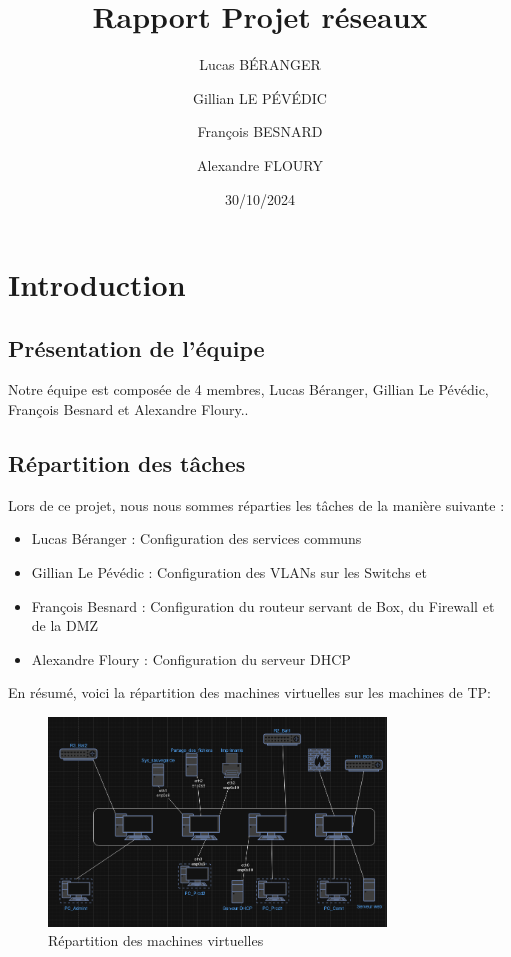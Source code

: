 \documentclass[a4paper,12pt]{report}
\title{Rapport Projet réseaux}
\author{
    Lucas BÉRANGER \and
    Gillian LE PÉVÉDIC \and
    François BESNARD \and
    Alexandre FLOURY \and
}
\date{30/10/2024}
\begin{document}
    \maketitle  
    \newpage

    \tableofcontents
    \newpage

    \chapter{Introduction}
        \section{Présentation de l'équipe}  
            Notre équipe est composée de 4 membres, Lucas Béranger, Gillian Le Pévédic, François Besnard et Alexandre Floury..

        \section{Répartition des tâches}
            Lors de ce projet, nous nous sommes réparties les tâches de la manière suivante :
            \begin{itemize}
                \item Lucas Béranger : Configuration des services communs
                \item Gillian Le Pévédic : Configuration des VLANs sur les Switchs et 
                \item François Besnard :  Configuration du routeur servant de Box, du Firewall et de la DMZ
                \item Alexandre Floury : Configuration du serveur DHCP
            \end{itemize}

            En résumé, voici la répartition des machines virtuelles sur les machines de TP:
            \begin{figure}
                \centering
                \includegraphics[width=0.8\textwidth]{Images/Repartition_machines_projetReseau.png}
                \caption{Répartition des machines virtuelles}
            \end{figure}
\end{document}
